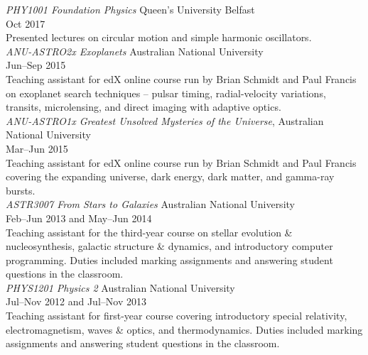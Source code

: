\documentclass[11pt]{res} %
\begin{document}
\begin{resume}
  {\it PHY1001 Foundation Physics} \hfill Queen's University Belfast\\
  \null\hfill Oct 2017\\
  Presented lectures on circular motion and simple harmonic oscillators.\\

  {\it ANU-ASTRO2x Exoplanets} \hfill Australian National University\\
  \null\hfill Jun--Sep 2015\\
  Teaching assistant for edX online course run by Brian Schmidt and Paul Francis on exoplanet search techniques -- pulsar timing, radial-velocity variations, transits, microlensing, and direct imaging with adaptive optics.\\

  {\it ANU-ASTRO1x Greatest Unsolved Mysteries of the Universe}, \hfill Australian National University\\
  \null\hfill Mar--Jun 2015\\
  Teaching assistant for edX online course run by Brian Schmidt and Paul Francis covering the expanding universe, dark energy, dark matter, and gamma-ray bursts.\\

  {\it ASTR3007 From Stars to Galaxies} \hfill Australian National University\\
  \null\hfill Feb--Jun 2013 and May--Jun 2014\\
  Teaching assistant for the third-year course on stellar evolution \& nucleosynthesis, galactic structure \& dynamics, and introductory computer programming. Duties included marking assignments and answering student questions in the classroom.\\

  {\it PHYS1201 Physics 2} \hfill Australian National University\\
  \null\hfill Jul--Nov 2012 and Jul--Nov 2013\\
  Teaching assistant for first-year course covering introductory special relativity, electromagnetism, waves \& optics, and thermodynamics. Duties included marking assignments and answering student questions in the classroom.

\pagebreak
\begin{comment}
\section{Referees}
  \textbf{Dr. Stuart Sim}\\
  Lecturer, Centre for Astrophysics Research\\
  Queen's University Belfast, UK\\
  stuart.sim@anu.edu.au


\end{comment}
\end{resume}
\end{document}
